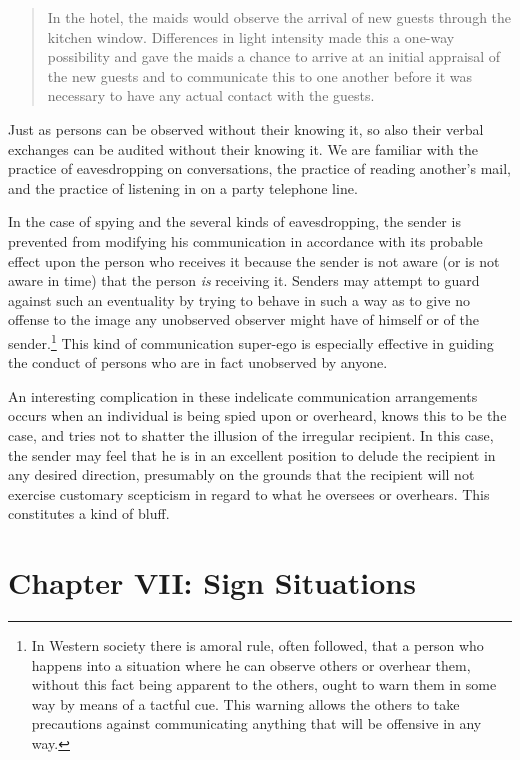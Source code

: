 \documentclass[twoside,symmetric,nobib,justified]{tufte-book}
\let\oldchapter\chapter
\def\chapter{%
  \setcounter{footnote}{0}%
  \oldchapter
}
\begin{document}
\begin{quote}
In the hotel, the maids would observe the arrival of new guests through
the kitchen window. Differences in light intensi­ty made this a one-way
possibility and gave the maids a chance to arrive at an initial
appraisal of the new guests and to communicate this to one another
before it was necessary to have any actual contact with the guests.
\end{quote}

\noindent Just as persons can be observed without their knowing it, so also their
verbal exchanges can be audited without their knowing it. We are
familiar with the practice of eavesdropping on conversations, the
practice of reading another's mail, and the practice of listening in on
a party telephone line.

In the case of spying and the several kinds of eaves­dropping, the sender
is prevented from modifying his communication in accordance with its
probable effect upon the person who receives it because the sender is
not aware (or is not aware in time) that the person \emph{is }receiving
it. Senders may attempt to guard against such an eventuality by trying
to behave in such a way as to give no offense to the image any
unobserved observer might have of himself or of the sender.\footnote{In
  Western society there is amoral rule, often followed, that a person
  who happens into a situation where he can observe others or overhear
  them, without this fact being apparent to the others, ought to warn
  them in some way by means of a tactful cue. This warning allows the
  others to take precautions against communicating anything that will be
  offensive in any way.} This kind of communication super-ego is
especially effective in guiding the conduct of persons who are in fact
unobserved by anyone.

An interesting complication in these indelicate communication
arrangements occurs when an individual is being spied upon or overheard,
knows this to be the case, and tries not to shatter the illusion of the
irregular recipient. In this case, the sender may feel that he is in an
excellent position to de­lude the recipient in any desired direction,
presumably on the grounds that the recipient will not exercise customary
scepticism in regard to what he oversees or overhears. This constitutes
a kind of bluff.

\chapter[CHAPTER VII: SIGN SITUATIONS]{Chapter VII: Sign Situations}
\label{ch:Chapter VII: Sign Situations}
\end{document}
